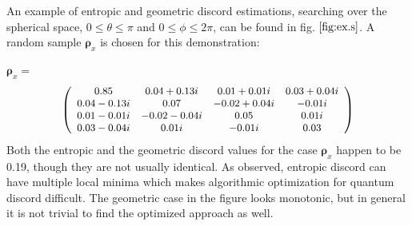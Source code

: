 \documentclass[%
 reprint,
 amsmath,amssymb,
 aps,
]{revtex4-1}
\begin{document}
An example of entropic and geometric discord estimations, searching over the spherical space, $0 \le \theta \le \pi$ and $0 \le \phi \le 2\pi$, can be found in fig. $\ref{fig:ex.s}$. A random sample $\boldsymbol{\rho}_x$ is chosen for this demonstration:

$\boldsymbol{\rho}_x =$
\begin{align*}
\begin{small} \left( \begin{array}{cccc}
0.85 & 0.04 + 0.13 i & 0.01 + 0.01 i & 0.03 + 0.04 i \\
0.04 - 0.13 i & 0.07  & -0.02 + 0.04 i  & - 0.01 i \\
0.01 - 0.01 i & -0.02 - 0.04 i & 0.05 & 0.01 i \\
0.03 - 0.04 i & 0.01 i & - 0.01 i  & 0.03 \end{array} \right) \end{small}
\end{align*}
\noindent Both the entropic and the geometric discord values for the case $\boldsymbol{\rho}_x$ happen to be 0.19, though they are not usually identical. As observed, entropic discord can have multiple local minima which makes algorithmic optimization for quantum discord difficult. The geometric case in the figure looks monotonic, but in general it is not trivial to find the optimized approach as well.
\end{document}
